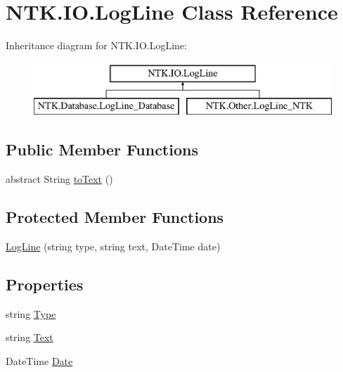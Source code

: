 \hypertarget{class_n_t_k_1_1_i_o_1_1_log_line}{}\section{N\+T\+K.\+I\+O.\+Log\+Line Class Reference}
\label{class_n_t_k_1_1_i_o_1_1_log_line}


 


Inheritance diagram for N\+T\+K.\+I\+O.\+Log\+Line\+:\begin{figure}[H]
\begin{center}
\leavevmode
\includegraphics[height=2.000000cm]{d1/d09/class_n_t_k_1_1_i_o_1_1_log_line}
\end{center}
\end{figure}
\subsection*{Public Member Functions}
\begin{DoxyCompactItemize}
\item 
abstract String \mbox{\hyperlink{class_n_t_k_1_1_i_o_1_1_log_line_a0c893a688594052ad3a4f7d6181746f6}{to\+Text}} ()
\end{DoxyCompactItemize}
\subsection*{Protected Member Functions}
\begin{DoxyCompactItemize}
\item 
\mbox{\hyperlink{class_n_t_k_1_1_i_o_1_1_log_line_ad405c935b109011e65a71843a7496729}{Log\+Line}} (string type, string text, Date\+Time date)
\end{DoxyCompactItemize}
\subsection*{Properties}
\begin{DoxyCompactItemize}
\item 
string \mbox{\hyperlink{class_n_t_k_1_1_i_o_1_1_log_line_a6c75f9c036369d2a6a9a62653ff20df5}{Type}}
\item 
string \mbox{\hyperlink{class_n_t_k_1_1_i_o_1_1_log_line_a8f518c7a9ca5ac98d3c8fd0c631b8983}{Text}}
\item 
Date\+Time \mbox{\hyperlink{class_n_t_k_1_1_i_o_1_1_log_line_a716288c0308355faa9afa8458f175681}{Date}}
\end{DoxyCompactItemize}


